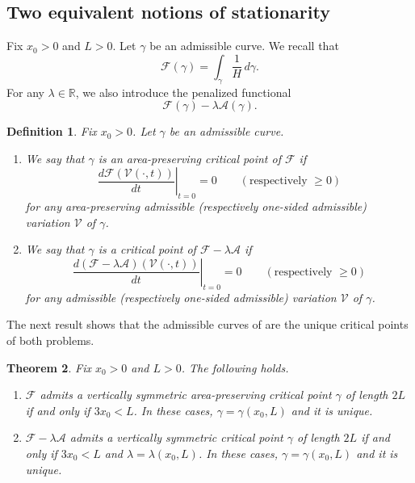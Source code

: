 \documentclass[11pt]{amsart}
\renewcommand{\geq}{\geqslant}
\newcommand{\A}{\mathcal A}
\newcommand{\F}{\mathcal F}
\newcommand{\rr}{{\mathbb{R}}}
\newtheorem{theorem}{Theorem}[section]
\newtheorem{definition}[theorem]{Definition}
\theoremstyle{definition}
\theoremstyle{remark}
\numberwithin{equation}{section}
\begin{document}
\subsection{Two equivalent notions of stationarity}\label{sec_station}
Fix $x_0>0$ and $L>0$. Let $\gamma$ be an admissible curve. We recall that 
\begin{equation*}
\F(\gamma)=\int_\gamma\frac{1}{H}\,d\gamma.
\end{equation*}
For any $\lambda\in\rr$, we also introduce the penalized functional 
\begin{equation*}
\F(\gamma)-\lambda \A(\gamma).
\end{equation*}
\begin{definition}
Fix $x_0>0$. Let $\gamma$ be an admissible curve.

\begin{enumerate}
	\item We say that $\gamma$ is an \emph{area-preserving critical point} of $\F$ if
	\begin{equation*}
		\left.\frac{d\F(\mathcal V(\cdot,t))}{dt}\right|_{t=0}=0\qquad(\text{respectively $\geq 0$})
	\end{equation*}
	for any area-preserving admissible (respectively one-sided admissible) variation $\mathcal V$ of $\gamma$.
	\item We say that $\gamma$ is a \emph{critical point} of $\F-\lambda\A$ if
	\begin{equation*}
		\left.\frac{d(\F-\lambda\A)(\mathcal V(\cdot,t))}{dt}\right|_{t=0}=0\qquad(\text{respectively $\geq 0$})
	\end{equation*}
	for any admissible (respectively one-sided admissible) variation $\mathcal V$ of $\gamma$.
\end{enumerate}
\end{definition}
The next result shows that the admissible curves of  are the unique critical points of both problems.
\begin{theorem}\label{uniquecriticalthm}
Fix $x_0>0$ and $L>0$. The following holds.
\begin{enumerate}
	\item [(i)]$\F$ admits a vertically symmetric area-preserving critical point $\gamma$ of length $2L$ if and only if $3x_0<L$. In these cases, $\gamma=\gamma(x_0,L)$ and it is unique.
	\item [(ii)]$\F-\lambda\A$ admits a vertically symmetric  critical point $\gamma$ of length $2L$ if and only if $3x_0<L$ and $\lambda=\lambda(x_0,L)$. In these cases, $\gamma=\gamma(x_0,L)$ and it is unique.
\end{enumerate}
\end{theorem}
\end{document}
